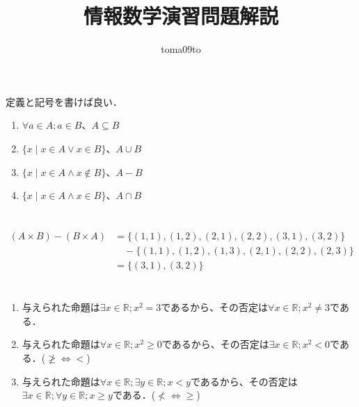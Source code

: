 \documentclass[a4paper,12pt]{ltjsarticle}
\title{情報数学演習問題解説}
\author{toma09to}
\date{}
\begin{document}
\maketitle

\section{}
定義と記号を書けば良い．
\begin{enumerate}[(1)]
    \item $\forall a \in A ; a \in B$、$A \subseteq B$
    \item $\{ x \mid x \in A \lor x \in B \}$、$A \cup B$
    \item $\{ x \mid x \in A \land x \notin B \}$、$A - B$
    \item $\{ x \mid x \in A \land x \in B \}$、$A \cap B$
\end{enumerate}

\section{}
\begin{align*}
    (A \times B) - (B \times A) &= \{ (1,1), (1,2), (2,1), (2,2), (3,1), (3,2) \} \\
                                &\quad - \{ (1,1), (1,2), (1,3), (2,1), (2,2), (2,3) \} \\
                                &= \{ (3,1), (3,2) \}
\end{align*}

\section{}
\begin{enumerate}[(1)]
    \item 与えられた命題は$\exists x \in \mathbb{R} ; x^2 = 3$であるから、その否定は$\forall x \in \mathbb{R} ; x^2 \neq 3$である．
    \item 与えられた命題は$\forall x \in \mathbb{R} ; x^2 \geq 0$であるから、その否定は$\exists x \in \mathbb{R} ; x^2 < 0$である．($\ngeq \Leftrightarrow <$)
    \item 与えられた命題は$\forall x \in \mathbb{R} ; \exists y \in \mathbb{R} ; x < y$であるから、その否定は$\exists x \in \mathbb{R} ; \forall y \in \mathbb{R} ; x \geq y$である．($\nless \Leftrightarrow \geq$)
\end{enumerate}
\end{document}
